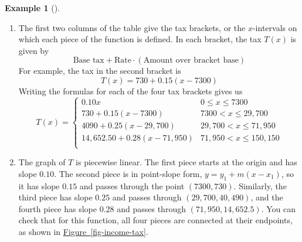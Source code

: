 \documentclass[10pt,]{book}
\theoremstyle{plain}
\theoremstyle{definition}
\theoremstyle{definition}
\newtheorem{example}[theorem]{Example}
\numberwithin{equation}{section}
\newcommand{\alert}[1]{\mathbf{\color{magenta}{#1}}}
\newcommand{\lt}{ < }
\newcommand{\amp}{ & }
\begin{document}
\begin{example}[]
\begin{enumerate}[label=*\alph**]
            The income \(x = 40,000\) is in the third bracket, so the tax is 
            \begin{equation*}T (\alert{40,000}) = 4090 + 0.25(\alert{40,000} − 29,700) = 6665\end{equation*}\item\hypertarget{li-339}{}
            The first two columns of the table give the tax brackets, or the \(x\)-intervals on which each piece of the function is defined. In each bracket, the tax \(T(x)\) is given by 
            \begin{equation*}\text{Base tax} + \text{Rate}\cdot(\text{Amount over bracket base}) \end{equation*}
            For example, the tax in the second bracket is 
            \begin{equation*}T (x) = 730 + 0.15(x − 7300)\end{equation*}
            Writing the formulas for each of the four tax brackets gives us
            \begin{equation*}
                T(x) =
                \begin{cases}
                0.10x \amp  0 \le x \le 7300\\
                730 + 0.15(x − 7300)  \amp  7300\lt x\le 29,700\\
                4090 + 0.25(x − 29,700) \amp  29,700\lt x\le 71,950\\
                14,652.50 + 0.28(x − 71,950)\amp 71,950\lt x\le 150,150\\
                \end{cases}
            \end{equation*}\item\hypertarget{li-340}{}
            The graph of \(T\) is piecewise linear. The first piece starts at the origin and has slope \(0.10\). The second piece is in point-slope form, \(y = y_1 + m(x − x_1)\), so it has slope \(0.15\) and passes through the point \((7300, 730)\). Similarly, the third piece has slope \(0.25\) and passes through \((29,700, 40,490)\), and the fourth piece has slope \(0.28\) and passes through \((71,950, 14,652.5)\). You can check that for this function, all four pieces are connected at their endpoints, as shown in \hyperref[fig-income-tax]{Figure~\ref{fig-income-tax}}.
            \leavevmode%
\begin{figure}
\centering

\end{figure}
\end{enumerate}
\end{example}
\end{document}
